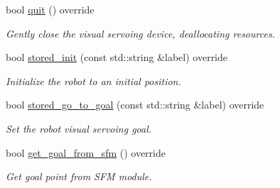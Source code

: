 \begin{DoxyCompactItemize}
bool \hyperlink{classVisualServoingServer_ac438c7abfb838df458f85e250ead3222}{quit} () override
\begin{DoxyCompactList}\small\item\em Gently close the visual servoing device, deallocating resources. \end{DoxyCompactList}\item 
bool \hyperlink{classVisualServoingServer_aded37e0e0111c40fe5f869b16bb1f799}{stored\+\_\+init} (const std\+::string \&label) override
\begin{DoxyCompactList}\small\item\em Initialize the robot to an initial position. \end{DoxyCompactList}\item 
bool \hyperlink{classVisualServoingServer_a1c5018056e6a7db492cc6b1418f8d1e5}{stored\+\_\+go\+\_\+to\+\_\+goal} (const std\+::string \&label) override
\begin{DoxyCompactList}\small\item\em Set the robot visual servoing goal. \end{DoxyCompactList}\item 
bool \hyperlink{classVisualServoingServer_a3b0e5078c2f32493a2ef31ea32450d80}{get\+\_\+goal\+\_\+from\+\_\+sfm} () override
\begin{DoxyCompactList}\small\item\em Get goal point from S\+FM module. \end{DoxyCompactList}\end{DoxyCompactItemize}
